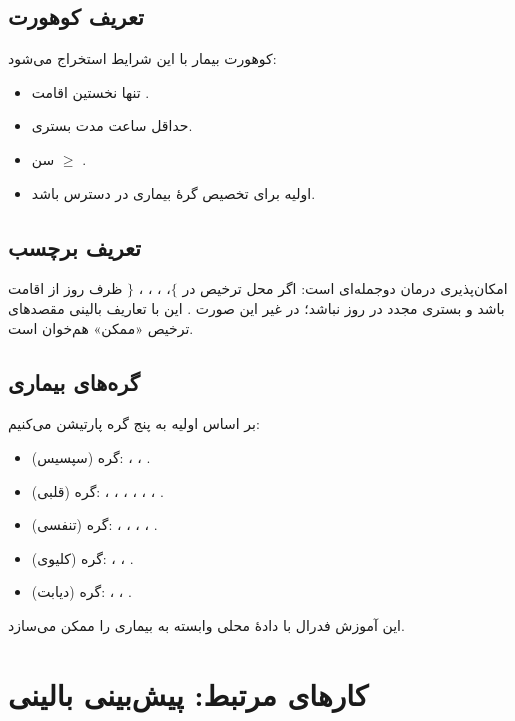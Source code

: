 \subsection{تعریف کوهورت}

کوهورت  بیمار با این شرایط استخراج می‌شود:
\begin{itemize}
\item تنها نخستین اقامت .
\item حداقل  ساعت مدت بستری.
\item سن $\geq$ .
\item {} اولیه برای تخصیص گرۀ بیماری در دسترس باشد.
\end{itemize}

\subsection{تعریف برچسب}

امکان‌پذیری درمان دوجمله‌ای است:  اگر محل ترخیص در $\{$، ، ، ، $\}$ ظرف  روز از اقامت  باشد و بستری مجدد در  روز نباشد؛ در غیر این صورت . این با تعاریف بالینی مقصدهای ترخیص «ممکن» هم‌خوان است.

\subsection{گره‌های بیماری}

بر اساس  اولیه به پنج گره پارتیشن می‌کنیم:
\begin{itemize}
\item گره  (سپسیس): ، ، .
\item گره  (قلبی): ، ، ، ، ، ، .
\item گره  (تنفسی): ، ، ، ، .
\item گره  (کلیوی): ، ، .
\item گره  (دیابت): ، ، .
\end{itemize}
این آموزش فدرال با دادۀ محلی وابسته به بیماری را ممکن می‌سازد.

\section{کارهای مرتبط: پیش‌بینی بالینی}

